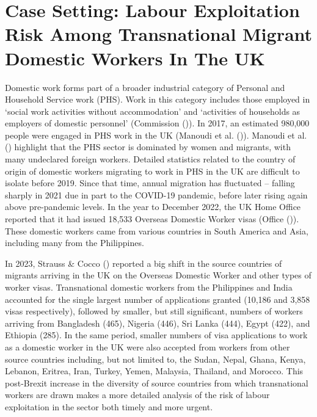 \documentclass[
  12pt,
]{article}
\theoremstyle{plain}
\theoremstyle{definition}
\begin{document}
\section{Case Setting: Labour Exploitation Risk Among Transnational
Migrant Domestic Workers In The
UK}\label{case-setting-labour-exploitation-risk-among-transnational-migrant-domestic-workers-in-the-uk}

Domestic work forms part of a broader industrial category of Personal
and Household Service work (PHS). Work in this category includes those
employed in `social work activities without accommodation' and
`activities of households as employers of domestic personnel'
(Commission ()). In
2017, an estimated 980,000 people were engaged in PHS work in the UK
(Manoudi et al. ()). Manoudi
et al. () highlight that the
PHS sector is dominated by women and migrants, with many undeclared
foreign workers. Detailed statistics related to the country of origin of
domestic workers migrating to work in PHS in the UK are difficult to
isolate before 2019. Since that time, annual migration has fluctuated --
falling sharply in 2021 due in part to the COVID-19 pandemic, before
later rising again above pre-pandemic levels. In the year to December
2022, the UK Home Office reported that it had issued 18,533 Overseas
Domestic Worker visas (Office
()). These domestic workers
came from various countries in South America and Asia, including many
from the Philippines.

In 2023, Strauss \& Cocco ()
reported a big shift in the source countries of migrants arriving in the
UK on the Overseas Domestic Worker and other types of worker visas.
Transnational domestic workers from the Philippines and India accounted
for the single largest number of applications granted (10,186 and 3,858
visas respectively), followed by smaller, but still significant, numbers
of workers arriving from Bangladesh (465), Nigeria (446), Sri Lanka
(444), Egypt (422), and Ethiopia (285). In the same period, smaller
numbers of visa applications to work as a domestic worker in the UK were
also accepted from workers from other source countries including, but
not limited to, the Sudan, Nepal, Ghana, Kenya, Lebanon, Eritrea, Iran,
Turkey, Yemen, Malaysia, Thailand, and Morocco. This post-Brexit
increase in the diversity of source countries from which transnational
workers are drawn makes a more detailed analysis of the risk of labour
exploitation in the sector both timely and more urgent.
\end{document}
